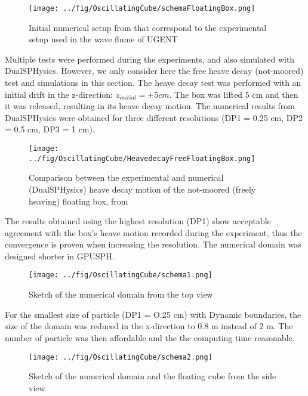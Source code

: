 \documentclass{../GPUSPHtemplate}
\begin{document}
\begin{figure}[H]
    \centering
    \texttt{[image: ../fig/OscillatingCube/schemaFloatingBox.png]}
    \caption{Initial numerical setup from \cite{CubeExp} that correspond to the experimental setup used in the wave flume of UGENT}
    \label{fig:schematicsetup}
\end{figure}

Multiple tests were performed during the experiments, and also simulated with
DualSPHysics. However, we only consider here the free heave decay (not-moored)
test and simulations in this section. The heave decay test was performed
with an initial drift in the z-direction: $z_{initial} = + 5 cm$. The box was
lifted 5 cm and then it was released, resulting in its heave decay motion.
The numerical results from DualSPHysics \cite{CubeExp} were obtained
for three different resolutions (DP1 = 0.25 cm, DP2 = 0.5 cm, DP3 = 1 cm).

\begin{figure}[H]
    \centering
    \texttt{[image: ../fig/OscillatingCube/HeavedecayFreeFloatingBox.png]}
    \caption{Comparison between the experimental and numerical (DualSPHysics) heave decay motion of the not-moored (freely heaving) floating box, from \cite{CubeExp}}
    \label{fig:heaveexpDual}
\end{figure}

The results obtained using the highest resolution (DP1) show acceptable
agreement with the box's heave motion recorded during the experiment,
thus the convergence is proven when increasing the resolution.
The numerical domain was designed shorter in GPUSPH. 
\begin{figure}[H]
    \centering
    \texttt{[image: ../fig/OscillatingCube/schema1.png]}
    \caption{Sketch of the numerical domain from the top view}
    \label{fig:shema1}
\end{figure}
For the smallest size of particle (DP1 = O.25 cm) with Dynamic boundaries, the size of the domain was reduced in the x-direction to 0.8 m instead of 2 m.
The number of particle was then affordable and the the computing time reasonable.

\begin{figure}[H]
    \centering
    \texttt{[image: ../fig/OscillatingCube/schema2.png]}
    \caption{Sketch of the numerical domain and the floating cube from the side view}
    \label{fig:shema2}
\end{figure}
\end{document}
